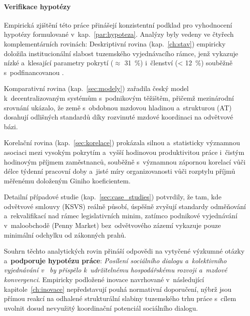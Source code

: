 \paragraph{Verifikace hypotézy}\label{par:hypoteza_overeni}
Empirická zjištění této práce přinášejí konzistentní podklad pro vyhodnocení hypotézy formulované v~kap.~\ref{par:hypoteza}. Analýzy byly vedeny ve čtyřech komplementárních rovinách:
Deskriptivní rovina (kap.~\ref{ch:stav}) empiricky doložila institucionální slabost tuzemského vyjednávacího rámce, jenž vykazuje nízké a~klesající parametry pokrytí ($\approx$ \SI{31}{\percent}) i~členství (< \SI{12}{\percent}) souběžně s~podfinancovanou .\par
Komparativní rovina (kap.~\ref{sec:modely}) zařadila český model k~decentralizovaným systémům s~podnikovým těžištěm, přičemž mezinárodní srovnání ukázalo, že země s~obdobnou mzdovou hladinou a~strukturou (\ac{AT}) dosahují odlišných standardů díky rozvinuté mzdové koordinaci na odvětvové bázi.\par
Korelační rovina (kap.~\ref{sec:korelace}) prokázala silnou a~statisticky významnou asociaci mezi vysokým pokrytím  a~vyšší hodinovou produktivitou práce i~čistým hodinovým příjmem zaměstnanců, souběžně s~významnou zápornou korelací vůči délce týdenní pracovní doby a~jisté míry organizovanosti vůči rozptylu příjmů měřenému doloženým Giniho koeficientem.\par
Detailní případové studie (kap.~\ref{sec:case_studies}) potvrdily, že tam, kde odvětvové smlouvy (\acs{KSVS}) reálně působí, úspěšně zvyšují standardy odměňování a~rekvalifikací nad rámec legislativních minim, zatímco podnikové vyjednávání v~maloobchodě (Penny Market) bez~odvětvového zázemí vykazuje pouze minimální odchylku od zákonných prahů.\par

Souhrn těchto analytických rovin přináší odpovědi na vytyčené výzkumné otázky a~\textbf{podporuje hypotézu práce}: \emph{Posílení sociálního dialogu a~kolektivního vyjednávání v~ by přispělo k~udržitelnému hospodářskému rozvoji a~mzdové konvergenci}. Empiricky podložené inovace navrhované v~následující kapitole~\ref{ch:inovace} nepředstavují pouhá normativní doporučení, nýbrž jsou přímou reakcí na odhalené strukturální slabiny tuzemského trhu práce s~cílem uvolnit dosud nevyužitý koordinační potenciál sociálního dialogu.\par
